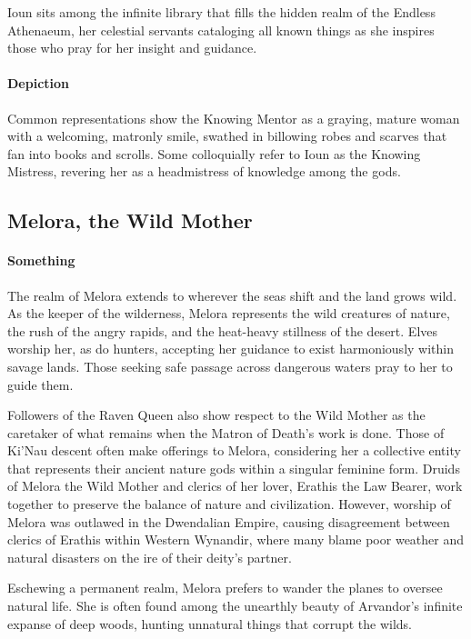 \documentclass[letterpaper,twocolumn,openany,nodeprecatedcode]{dndbook}
\begin{document}
Ioun sits among the infinite library that fills the hidden realm of the Endless Athenaeum,
her celestial servants cataloging all known things as she inspires those who pray for
her insight and guidance.

\paragraph{Depiction}
Common representations show the Knowing Mentor as a graying, mature woman with a welcoming,
matronly smile, swathed in billowing robes and scarves that fan into books and scrolls.
Some colloquially refer to Ioun as the Knowing Mistress, revering her as a headmistress
of knowledge among the gods.

\subsection{Melora, the Wild Mother}

\paragraph{Something}
The realm of Melora extends to wherever the seas shift and the land grows wild. As the
keeper of the wilderness, Melora represents the wild creatures of nature, the rush of the
angry rapids, and the heat-heavy stillness of the desert. Elves worship her, as do hunters,
accepting her guidance to exist harmoniously within savage lands. Those seeking safe passage
across dangerous waters pray to her to guide them.

Followers of the Raven Queen also show respect to the Wild Mother as the caretaker of
what remains when the Matron of Death’s work is done. Those of Ki’Nau descent often make
offerings to Melora, considering her a collective entity that represents their ancient nature
gods within a singular feminine form. Druids of Melora the Wild Mother and clerics of her
lover, Erathis the Law Bearer, work together to preserve the balance of nature and
civilization. However, worship of Melora was outlawed in the Dwendalian Empire, causing
disagreement between clerics of Erathis within Western Wynandir, where many blame poor
weather and natural disasters on the ire of their deity’s partner.

Eschewing a permanent realm, Melora prefers to wander the planes to oversee natural life.
She is often found among the unearthly beauty of Arvandor’s infinite expanse of deep woods,
hunting unnatural things that corrupt the wilds.
\end{document}
